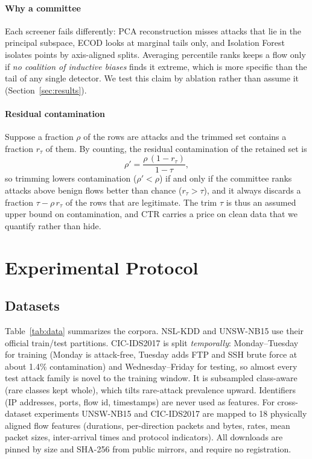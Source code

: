 \documentclass[journal]{IEEEtran}
\begin{document}
\paragraph*{Why a committee}
Each screener fails differently: PCA reconstruction misses attacks that lie in the principal subspace, ECOD looks at marginal tails only, and Isolation Forest isolates points by axis-aligned splits. Averaging percentile ranks keeps a flow only if \emph{no coalition of inductive biases} finds it extreme, which is more specific than the tail of any single detector. We test this claim by ablation rather than assume it (Section~\ref{sec:results}).

\paragraph*{Residual contamination}
Suppose a fraction $\rho$ of the rows are attacks and the trimmed set contains a fraction $r_\tau$ of them. By counting, the residual contamination of the retained set is
\begin{equation}
\rho'=\frac{\rho\,(1-r_\tau)}{1-\tau},
\label{eq:resid}
\end{equation}
so trimming lowers contamination ($\rho'<\rho$) if and only if the committee ranks attacks above benign flows better than chance ($r_\tau>\tau$), and it always discards a fraction $\tau-\rho\,r_\tau$ of the rows that are legitimate. The trim $\tau$ is thus an assumed upper bound on contamination, and CTR carries a price on clean data that we quantify rather than hide.

\section{Experimental Protocol}
\label{sec:protocol}
\subsection{Datasets}
Table~\ref{tab:data} summarizes the corpora. NSL-KDD and UNSW-NB15 use their official train/test partitions. CIC-IDS2017 is split \emph{temporally}: Monday--Tuesday for training (Monday is attack-free, Tuesday adds FTP and SSH brute force at about 1.4\% contamination) and Wednesday--Friday for testing, so almost every test attack family is novel to the training window. It is subsampled class-aware (rare classes kept whole), which tilts rare-attack prevalence upward. Identifiers (IP addresses, ports, flow id, timestamps) are never used as features. For cross-dataset experiments UNSW-NB15 and CIC-IDS2017 are mapped to 18 physically aligned flow features (durations, per-direction packets and bytes, rates, mean packet sizes, inter-arrival times and protocol indicators). All downloads are pinned by size and SHA-256 from public mirrors, and require no registration.
\end{document}
